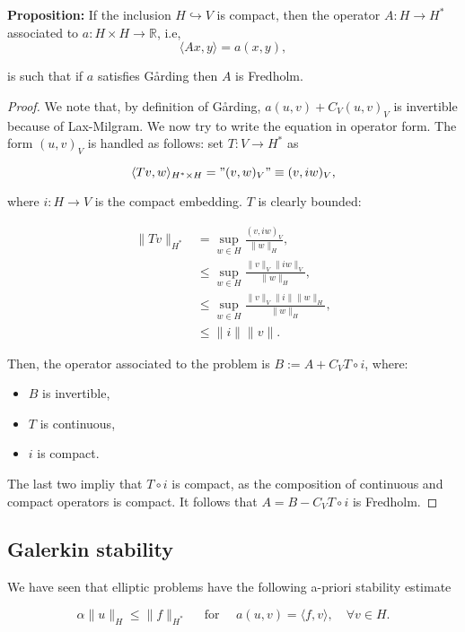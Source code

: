 \documentclass{article}
\newcommand{\R}{\mathbb{R}}
\begin{document}
\textbf{Proposition:}
 If the inclusion $H\hookrightarrow V$ is compact, then the operator $A: H\to H^*$ associated to $a:H\times H\to \R$, i.e,
 \[\langle Ax,y\rangle = a(x,y),\]

 is such that if $a$ satisfies Gårding then $A$ is Fredholm. 

\begin{proof}
    We note that, by definition of Gårding,  \(a(u,v) + C_V(u,v)_V\) is invertible because of Lax-Milgram. 
    We now try to write the equation in operator form. The form $(u,v)_V$ is handled as follows: set $T:V\to H^*$ as

    \[\langle Tv, w\rangle_{H^*\times H} = "(v,w)_V"\equiv (v,iw)_V,\]

    where $i: H\to V$ is the compact embedding. $T$ is clearly bounded:

    \begin{align*}
        \|Tv\|_{H^*} &= \sup_{w\in H}\frac{(v,iw)_V}{\|w\|_H},\\
        &\leq \sup_{w\in H}\frac{\|v\|_V\|iw\|_V}{\|w\|_H},\\
        &\leq \sup_{w\in H}\frac{\|v\|_V\|i\|\|w\|_H}{\|w\|_H},\\
        &\leq \|i\|\|v\|.
    \end{align*}

    Then, the operator associated to the problem is $B :=A + C_V T\circ i$, where:
    \begin{itemize}
        \item $B$ is invertible,
        \item $T$ is continuous,
        \item $i$ is compact. 
    \end{itemize}

    The last two impliy that $T\circ i$ is compact, as the composition of continuous and compact operators is compact. 
    It follows that $A = B - C_V T\circ i$ is Fredholm.
\end{proof}



\subsection{Galerkin stability}

We have seen that elliptic problems have the following a-priori stability estimate

\[\alpha \|u\|_H \leq \|f\|_{H^*}\quad\text{ for }\quad a(u,v) = \langle f, v\rangle, \quad \forall v\in H.\]
\end{document}
